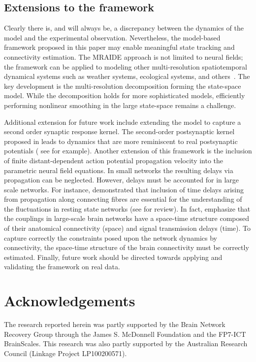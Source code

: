 \documentclass[review,authoryear,3p]{elsarticle}
\begin{document}
\subsection{Extensions to the framework} 
Clearly there is, and will always be, a discrepancy between the dynamics of the model and the experimental observation. Nevertheless, the model-based framework proposed in this paper may enable meaningful state tracking and connectivity estimation. The MRAIDE approach is not limited to neural fields; the framework can be applied to modeling other multi-resolution spatiotemporal dynamical systems such as weather systems, ecological systems, and others~\citep{Wikle2002,Xu2005}. The key development is the multi-resolution decomposition forming the state-space model. While the decomposition holds for more sophisticated models, efficiently performing nonlinear smoothing in the large state-space remains a challenge.                                                                                                 

Additional extension for future work include extending the model to capture a second order synaptic response kernel. The second-order postsynaptic kernel proposed in \citet{VanRotterdam1982} leads to dynamics that are more reminiscent to real postsynaptic potentials ( see \citet{Spiegler2010,Spiegler2011} for example). Another extension of this framework is the inclusion of finite distant-dependent action potential propagation velocity into the parametric neural field equations. In small networks the resulting delays via propagation can be neglected. However, delays must be accounted for in large scale networks. For instance, \citet{Ghosh2008} demonstrated that inclusion of time delays arising from propagation along connecting fibres are essential for the understanding of the fluctuations in resting state networks (see \citet{Deco2010} for review). In fact, \citet{Ghosh2008} emphasize that the couplings in large-scale brain networks have a space-time structure composed of their anatomical connectivity (space) and signal transmission delays (time). To capture correctly the constraints posed upon the network dynamics by connectivity, the space-time structure of the brain connectivity must be correctly estimated. Finally, future work should be directed towards applying and validating the framework on real data. 
\section{Acknowledgements}
The research reported herein was partly supported by the Brain Network Recovery Group through the James S. McDonnell Foundation and the FP7-ICT BrainScales. This research was also partly supported by the Australian Research Council (Linkage Project LP100200571). 
\clearpage
\newpage
\end{document}
